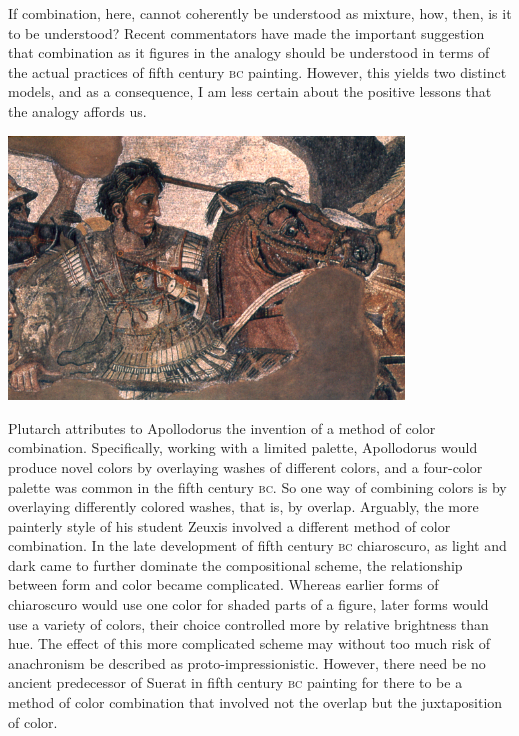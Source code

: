If combination, here, cannot coherently be understood as mixture, how, then, is it to be understood? Recent commentators have made the important suggestion that combination as it figures in the analogy should be understood in terms of the actual practices of fifth century \textsc{bc} painting. However, this yields two distinct models, and as a consequence, I am less certain about the positive lessons that the analogy affords us. \change

\begin{frame}
    \begin{center}
        \includegraphics[height=7cm]{../../graphics/alexander.jpg}
    \end{center}
\end{frame}

Plutarch attributes to Apollodorus the invention of a method of color combination. Specifically, working with a limited palette, Apollodorus would produce novel colors by overlaying washes of different colors, and a four-color palette was common in the fifth century \textsc{bc}. So one way of combining colors is by overlaying differently colored washes, that is, by overlap. Arguably, the more painterly style of his student Zeuxis involved a different method of color combination. In the late development of fifth century \textsc{bc} chiaroscuro, as light and dark came to further dominate the compositional scheme, the relationship between form and color became complicated. Whereas earlier forms of chiaroscuro would use one color for shaded parts of a figure, later forms would use a variety of colors, their choice controlled more by relative brightness than hue. The effect of this more complicated scheme may without too much risk of anachronism be described as proto-impressionistic. However, there need be no ancient predecessor of Suerat in fifth century \textsc{bc} painting for there to be a method of color combination that involved not the overlap but the juxtaposition of color.

